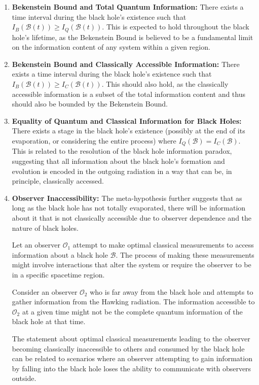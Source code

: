 	\begin{enumerate}
		\item \textbf{Bekenstein Bound and Total Quantum Information:} There exists a time interval during the black hole's existence such that $I_B(\mathcal{B}(t)) \ge I_Q(\mathcal{B}(t))$. This is expected to hold throughout the black hole's lifetime, as the Bekenstein Bound is believed to be a fundamental limit on the information content of any system within a given region.
		
		\item \textbf{Bekenstein Bound and Classically Accessible Information:} There exists a time interval during the black hole's existence such that $I_B(\mathcal{B}(t)) \ge I_C(\mathcal{B}(t))$. This should also hold, as the classically accessible information is a subset of the total information content and thus should also be bounded by the Bekenstein Bound.
		
		\item \textbf{Equality of Quantum and Classical Information for Black Holes:} There exists a stage in the black hole's existence (possibly at the end of its evaporation, or considering the entire process) where $I_Q(\mathcal{B}) = I_C(\mathcal{B})$. This is related to the resolution of the black hole information paradox, suggesting that all information about the black hole's formation and evolution is encoded in the outgoing radiation in a way that can be, in principle, classically accessed.
		
		\item \textbf{Observer Inaccessibility:} The meta-hypothesis further suggests that as long as the black hole has not totally evaporated, there will be information about it that is not classically accessible due to observer dependence and the nature of black holes.
		
		Let an observer $\mathcal{O}_1$ attempt to make optimal classical measurements to access information about a black hole $\mathcal{B}$. The process of making these measurements might involve interactions that alter the system or require the observer to be in a specific spacetime region.
		
		Consider an observer $\mathcal{O}_2$ who is far away from the black hole and attempts to gather information from the Hawking radiation. The information accessible to $\mathcal{O}_2$ at a given time might not be the complete quantum information of the black hole at that time.
		
		The statement about optimal classical measurements leading to the observer becoming classically inaccessible to others and consumed by the black hole can be related to scenarios where an observer attempting to gain information by falling into the black hole loses the ability to communicate with observers outside.
		

\end{enumerate}

